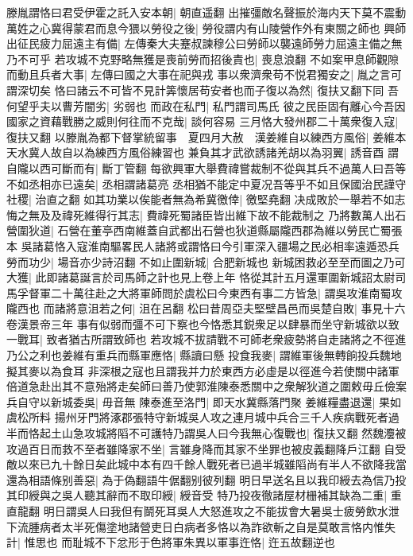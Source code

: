 滕胤謂恪曰君受伊霍之託入安本朝|{
	朝直遥翻}
出摧彊敵名聲振於海内天下莫不震動萬姓之心冀得蒙君而息今猥以勞役之後|{
	勞役謂内有山陵營作外有東關之師也}
興師出征民疲力屈遠主有備|{
	左傳秦大夫蹇叔諫穆公曰勞師以襲遠師勞力屈遠主備之無乃不可乎}
若攻城不克野略無獲是喪前勞而招後責也|{
	喪息浪翻}
不如案甲息師觀隙而動且兵者大事|{
	左傳曰國之大事在祀與戎}
事以衆濟衆苟不悦君獨安之|{
	胤之言可謂深切矣}
恪曰諸云不可皆不見計筭懷居苟安者也而子復以為然|{
	復扶又翻下同}
吾何望乎夫以曹芳闇劣|{
	劣弱也}
而政在私門|{
	私門謂司馬氏}
彼之民臣固有離心今吾因國家之資藉戰勝之威則何往而不克哉|{
	談何容易}
三月恪大發州郡二十萬衆復入寇|{
	復扶又翻}
以滕胤為都下督掌統留事　夏四月大赦　漢姜維自以練西方風俗|{
	姜維本天水冀人故自以為練西方風俗練習也}
兼負其才武欲誘諸羌胡以為羽翼|{
	誘音酉}
謂自隴以西可斷而有|{
	斷丁管翻}
每欲興軍大舉費禕嘗裁制不從與其兵不過萬人曰吾等不如丞相亦已遠矣|{
	丞相謂諸葛亮}
丞相猶不能定中夏况吾等乎不如且保國治民謹守社稷|{
	治直之翻}
如其功業以俟能者無為希冀徼倖|{
	徼堅堯翻}
决成敗於一舉若不如志悔之無及及禕死維得行其志|{
	費禕死蜀諸臣皆出維下故不能裁制之}
乃將數萬人出石營圍狄道|{
	石營在董亭西南維蓋自武都出石營也狄道縣屬隴西郡為維以勞民亡蜀張本}
吳諸葛恪入寇淮南驅畧民人諸將或謂恪曰今引軍深入疆場之民必相率遠遁恐兵勞而功少|{
	場音亦少詩沼翻}
不如止圍新城|{
	合肥新城也}
新城困救必至至而圖之乃可大獲|{
	此即諸葛誕言於司馬師之計也見上卷上年}
恪從其計五月還軍圍新城詔太尉司馬孚督軍二十萬往赴之大將軍師問於虞松曰今東西有事二方皆急|{
	謂吳攻淮南蜀攻隴西也}
而諸將意沮若之何|{
	沮在呂翻}
松曰昔周亞夫堅壁昌邑而吳楚自敗|{
	事見十六卷漢景帝三年}
事有似弱而彊不可下察也今恪悉其鋭衆足以肆暴而坐守新城欲以致一戰耳|{
	致者猶古所謂致師也}
若攻城不拔請戰不可師老衆疲勢將自走諸將之不徑進乃公之利也姜維有重兵而縣軍應恪|{
	縣讀曰懸}
投食我麥|{
	謂維軍後無轉餉投兵魏地擬其麥以為食耳}
非深根之寇也且謂我并力於東西方必虛是以徑進今若使關中諸軍倍道急赴出其不意殆將走矣師曰善乃使郭淮陳泰悉關中之衆解狄道之圍敕毋丘儉案兵自守以新城委吳|{
	毋音無}
陳泰進至洛門|{
	即天水冀縣落門聚}
姜維糧盡退還|{
	果如虞松所料}
揚州牙門將涿郡張特守新城吳人攻之連月城中兵合三千人疾病戰死者過半而恪起土山急攻城將䧟不可護特乃謂吳人曰今我無心復戰也|{
	復扶又翻}
然魏灋被攻過百日而救不至者雖降家不坐|{
	言雖身降而其家不坐罪也被皮義翻降戶江翻}
自受敵以來已九十餘日矣此城中本有四千餘人戰死者已過半城雖䧟尚有半人不欲降我當還為相語條别善惡|{
	為于偽翻語牛倨翻别彼列翻}
明日早送名且以我印綬去為信乃投其印綬與之吳人聽其辭而不取印綬|{
	綬音受}
特乃投夜徹諸屋材栅補其缺為二重|{
	重直龍翻}
明日謂吳人曰我但有鬬死耳吳人大怒進攻之不能拔會大暑吳士疲勞飲水泄下流腫病者太半死傷塗地諸營吏日白病者多恪以為詐欲斬之自是莫敢言恪内惟失計|{
	惟思也}
而耻城不下忿形于色將軍朱異以軍事迕恪|{
	迕五故翻逆也}
